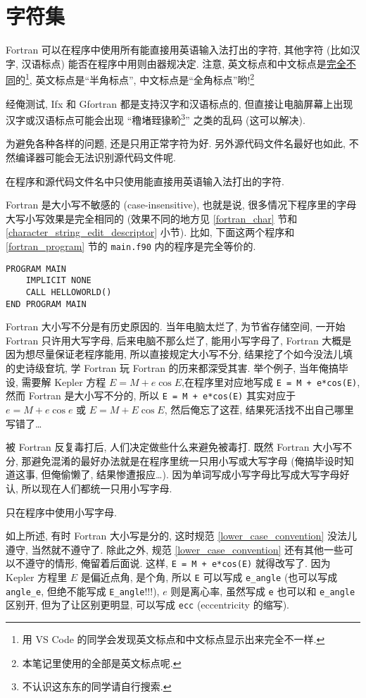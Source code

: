 \section{字符集}

Fortran 可以在程序中使用所有能直接用英语输入法打出的字符, 其他字符 (比如汉字, 汉语标点) 能否在程序中用则由器规决定. 注意, 英文标点和中文标点是\uline{完全不同}的\footnote{用 VS Code 的同学会发现英文标点和中文标点显示出来完全不一样.}, 英文标点是``半角标点'', 中文标点是``全角标点''哟!\footnote{本笔记里使用的全部是英文标点呢.}

经俺测试, Ifx 和 Gfortran 都是支持汉字和汉语标点的, 但直接让电脑屏幕上出现汉字或汉语标点可能会出现 ``穞堵臸猭畍\footnote{不认识这东东的同学请自行搜索.}'' 之类的乱码 (这可以解决).

为避免各种各样的问题, 还是只用正常字符为好. 另外源代码文件名最好也如此, 不然编译器可能会无法识别源代码文件呢.
\begin{convention}
    在程序和源代码文件名中只使用能直接用英语输入法打出的字符.\label{english_character_convention}
\end{convention}

Fortran 是大小写不敏感的 (case-insensitive), 也就是说, 很多情况下程序里的字母大写小写效果是完全相同的 (效果不同的地方见 \ref{fortran_char} 节和 \ref{character_string_edit_descriptor} 小节). 比如, 下面这两个程序和 \ref{fortran_program} 节的 \texttt{main.f90} 内的程序是完全等价的.
\begin{lstlisting}
PROGRAM MAIN
    IMPLICIT NONE
    CALL HELLOWORLD()
END PROGRAM MAIN
\end{lstlisting}

Fortran 大小写不分是有历史原因的. 当年电脑太烂了, 为节省存储空间, 一开始 Fortran 只许用大写字母, 后来电脑不那么烂了, 能用小写字母了, Fortran 大概是因为想尽量保证老程序能用, 所以直接规定大小写不分, 结果挖了个如今没法儿填的史诗级奆坑, 学 Fortran 玩 Fortran 的历来都深受其害. 举个例子, 当年俺搞毕设, 需要解 Kepler 方程 $E=M+e\cos E$,在程序里对应地写成 \texttt{E = M + e*cos(E)}, 然而 Fortran 是大小写不分的, 所以 \texttt{E = M + e*cos(E)} 其实对应于 $e=M+e\cos e$ 或 $E=M+E\cos E$, 然后俺忘了这茬, 结果死活找不出自己哪里写错了\dots{}

被 Fortran 反复毒打后, 人们决定做些什么来避免被毒打. 既然 Fortran 大小写不分, 那避免混淆的最好办法就是在程序里统一只用小写或大写字母 (俺搞毕设时知道这事, 但俺偷懒了, 结果惨遭报应\dots{}). 因为单词写成小写字母比写成大写字母好认, 所以现在人们都统一只用小写字母.
\begin{convention}
    只在程序中使用小写字母.\label{lower_case_convention}
\end{convention}
如上所述, 有时 Fortran 大小写是分的, 这时规范 \ref{lower_case_convention} 没法儿遵守, 当然就不遵守了. 除此之外, 规范 \ref{lower_case_convention} 还有其他一些可以不遵守的情形, 俺留着后面说. 这样, \texttt{E = M + e*cos(E)} 就得改写了. 因为 Kepler 方程里 $E$ 是偏近点角, 是个角, 所以 \texttt{E} 可以写成 \texttt{e\_{}angle} (也可以写成 \texttt{angle\_{}e}, 但绝不能写成 \texttt{E\_{}angle}!!!), $e$ 则是离心率, 虽然写成 \texttt{e} 也可以和 \texttt{e\_{}angle} 区别开, 但为了让区别更明显, 可以写成 \texttt{ecc} (eccentricity 的缩写).

